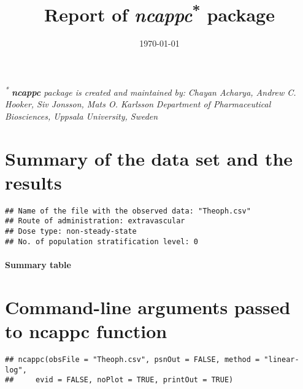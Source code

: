 \documentclass[pdflatex, a4paper, 11pt]{article}\usepackage[]{graphicx}\usepackage[]{color}
\title{\textbf{Report of \textit{ncappc}\textsuperscript{*} package}}
\author{\vspace{-0cm}}
\date{\today}
\makeatletter
\newenvironment{kframe}{%
 \def\at@end@of@kframe{}%
 \ifinner\ifhmode%
  \def\at@end@of@kframe{\end{minipage}}%
  \begin{minipage}{\columnwidth}%
 \fi\fi%
 \def\FrameCommand##1{\hskip\@totalleftmargin \hskip-\fboxsep
 \colorbox{shadecolor}{##1}\hskip-\fboxsep
     \hskip-\linewidth \hskip-\@totalleftmargin \hskip\columnwidth}%
 \MakeFramed {\advance\hsize-\width
   \@totalleftmargin\z@ \linewidth\hsize
   \@setminipage}}%
 {\par\unskip\endMakeFramed%
 \at@end@of@kframe}
\newenvironment{knitrout}{}{} %
\numberwithin{equation}{section}
\numberwithin{figure}{section}
\numberwithin{table}{section}
\makeatother
\begin{document}
\raggedright{}
\maketitle
\thispagestyle{empty}

\vfill
\textit{\textsuperscript{*} \textbf{ncappc} package is created and maintained by:}
\newline
\textit{Chayan Acharya, Andrew C. Hooker, Siv Jonsson, Mats O. Karlsson}
\newline
\textit{Department of Pharmaceutical Biosciences, Uppsala University, Sweden}
\clearpage

\newpage{}
\footnotesize
\tableofcontents
\thispagestyle{empty}
\clearpage
{}



\footnotesize
\section{Summary of the data set and the results}



\begin{knitrout}
\color{fgcolor}\begin{kframe}
\begin{lstlisting}[basicstyle=\ttfamily,breaklines=true]
## Name of the file with the observed data: "Theoph.csv"
## Route of administration: extravascular
## Dose type: non-steady-state
## No. of population stratification level: 0
\end{lstlisting}
\end{kframe}
\end{knitrout}
\paragraph{}

\begin{center}
\textbf{Summary table}


\end{center}
\paragraph{}

\footnotesize
\section{Command-line arguments passed to ncappc function}
\begin{knitrout}
\color{fgcolor}\begin{kframe}
\begin{lstlisting}[basicstyle=\ttfamily,breaklines=true]
## ncappc(obsFile = "Theoph.csv", psnOut = FALSE, method = "linear-log", 
##     evid = FALSE, noPlot = TRUE, printOut = TRUE)
\end{lstlisting}
\end{kframe}
\end{knitrout}
\end{document}
